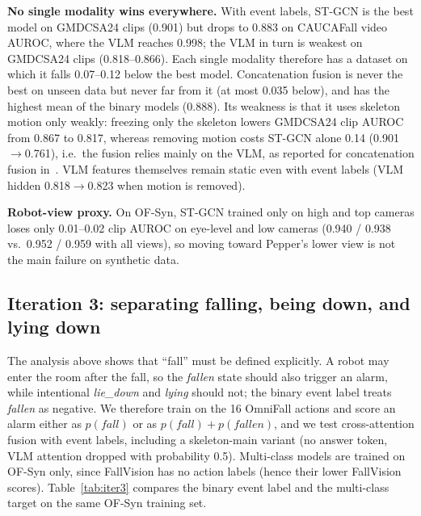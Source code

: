 \textbf{No single modality wins everywhere.}
With event labels, ST-GCN is the best model on GMDCSA24 clips (0.901) but drops to 0.883 on CAUCAFall video AUROC, where the VLM reaches 0.998; the VLM in turn is weakest on GMDCSA24 clips (0.818--0.866).
Each single modality therefore has a dataset on which it falls 0.07--0.12 below the best model.
Concatenation fusion is never the best on unseen data but never far from it (at most 0.035 below), and has the highest mean of the binary models (0.888).
Its weakness is that it uses skeleton motion only weakly: freezing only the skeleton lowers GMDCSA24 clip AUROC from 0.867 to 0.817, whereas removing motion costs ST-GCN alone 0.14 (0.901$\to$0.761), i.e.\ the fusion relies mainly on the VLM, as reported for concatenation fusion in~\citep{lamsal2026safer}.
VLM features themselves remain static even with event labels (VLM hidden 0.818$\to$0.823 when motion is removed).

\textbf{Robot-view proxy.}
On OF-Syn, ST-GCN trained only on high and top cameras loses only 0.01--0.02 clip AUROC on eye-level and low cameras (0.940 / 0.938 vs.\ 0.952 / 0.959 with all views), so moving toward Pepper's lower view is not the main failure on synthetic data.

\subsection{Iteration 3: separating falling, being down, and lying down}
\label{sec:iter3}
The analysis above shows that ``fall'' must be defined explicitly.
A robot may enter the room after the fall, so the \emph{fallen} state should also trigger an alarm, while intentional \emph{lie\_down} and \emph{lying} should not; the binary event label treats \emph{fallen} as negative.
We therefore train on the 16 OmniFall actions and score an alarm either as $p(\textit{fall})$ or as $p(\textit{fall})+p(\textit{fallen})$, and we test cross-attention fusion with event labels, including a skeleton-main variant (no answer token, VLM attention dropped with probability 0.5).
Multi-class models are trained on OF-Syn only, since FallVision has no action labels (hence their lower FallVision scores).
Table~\ref{tab:iter3} compares the binary event label and the multi-class target on the same OF-Syn training set.

